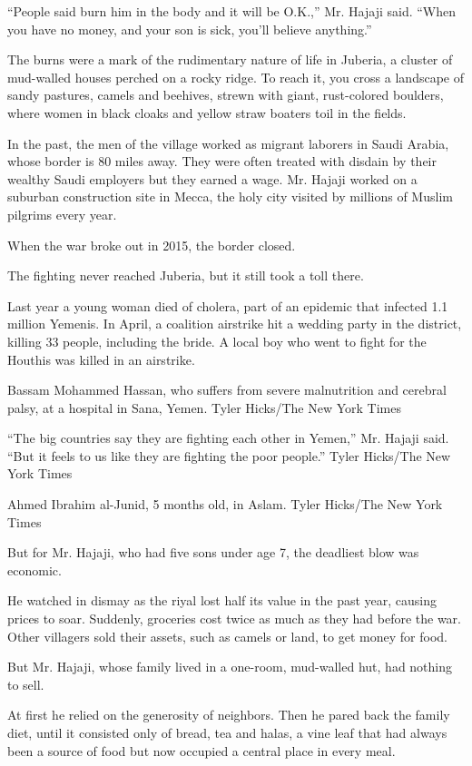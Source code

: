 ``People said burn him in the body and it will be O.K.,'' Mr. Hajaji
said. ``When you have no money, and your son is sick, you'll believe
anything.''

The burns were a mark of the rudimentary nature of life in Juberia, a
cluster of mud-walled houses perched on a rocky ridge. To reach it, you
cross a landscape of sandy pastures, camels and beehives, strewn with
giant, rust-colored boulders, where women in black cloaks and yellow
straw boaters toil in the fields.

In the past, the men of the village worked as migrant laborers in Saudi
Arabia, whose border is 80 miles away. They were often treated with
disdain by their wealthy Saudi employers but they earned a wage. Mr.
Hajaji worked on a suburban construction site in Mecca, the holy city
visited by millions of Muslim pilgrims every year.

When the war broke out in 2015, the border closed.

The fighting never reached Juberia, but it still took a toll there.

Last year a young woman died of cholera, part of an epidemic that
infected 1.1 million Yemenis. In April, a coalition airstrike hit a
wedding party in the district, killing 33 people, including the bride. A
local boy who went to fight for the Houthis was killed in an airstrike.

Bassam Mohammed Hassan, who suffers from severe malnutrition and
cerebral palsy, at a hospital in Sana, Yemen. Tyler Hicks/The New York
Times

``The big countries say they are fighting each other in Yemen,'' Mr.
Hajaji said. ``But it feels to us like they are fighting the poor
people.'' Tyler Hicks/The New York Times

Ahmed Ibrahim al-Junid, 5 months old, in Aslam. Tyler Hicks/The New York
Times

But for Mr. Hajaji, who had five sons under age 7, the deadliest blow
was economic.

He watched in dismay as the riyal lost half its value in the past year,
causing prices to soar. Suddenly, groceries cost twice as much as they
had before the war. Other villagers sold their assets, such as camels or
land, to get money for food.

But Mr. Hajaji, whose family lived in a one-room, mud-walled hut, had
nothing to sell.

At first he relied on the generosity of neighbors. Then he pared back
the family diet, until it consisted only of bread, tea and halas, a vine
leaf that had always been a source of food but now occupied a central
place in every meal.


